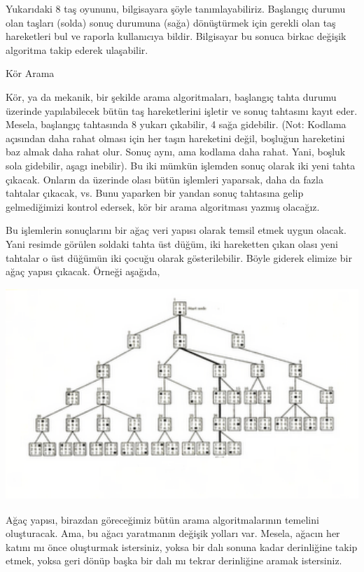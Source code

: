 \documentclass[12pt,fleqn]{article}\usepackage{../../common}
\begin{document}
Yukarıdaki 8 taş oyununu, bilgisayara şöyle tanımlayabiliriz. Başlangıç
durumu olan taşları (solda) sonuç durumuna (sağa) dönüştürmek için gerekli
olan taş hareketleri bul ve raporla kullanıcıya bildir. Bilgisayar bu
sonuca birkac değişik algoritma takip ederek ulaşabilir.

Kör Arama

Kör, ya da mekanik, bir şekilde arama algoritmaları, başlangıç tahta durumu
üzerinde yapılabilecek bütün taş hareketlerini işletir ve sonuç tahtasını
kayıt eder. Mesela, başlangıç tahtasında 8 yukarı çıkabilir, 4 sağa
gidebilir. (Not: Kodlama açısından daha rahat olması için her taşın
hareketini değil, boşluğun hareketini baz almak daha rahat olur. Sonuç
aynı, ama kodlama daha rahat. Yani, boşluk sola gidebilir, aşagı
inebilir). Bu iki mümkün işlemden sonuç olarak iki yeni tahta
çıkacak. Onların da üzerinde olası bütün işlemleri yaparsak, daha da fazla
tahtalar çıkacak, vs. Bunu yaparken bir yandan sonuç tahtasına gelip
gelmediğimizi kontrol edersek, kör bir arama algoritması yazmış olacağız.

Bu işlemlerin sonuçlarını bir ağaç veri yapısı olarak temsil etmek uygun
olacak. Yani resimde görülen soldaki tahta üst düğüm, iki hareketten çıkan
olası yeni tahtalar o üst düğümün iki çocuğu olarak gösterilebilir. Böyle
giderek elimize bir ağaç yapısı çıkacak. Örneği aşağıda,

\includegraphics[height=8cm]{8-puzzle-tree.png}

Ağaç yapısı, birazdan göreceğimiz bütün arama algoritmalarının temelini
oluşturacak. Ama, bu ağacı yaratmanın değişik yolları var. Mesela, ağacın
her katını mı önce oluşturmak istersiniz, yoksa bir dalı sonuna kadar
derinliğine takip etmek, yoksa geri dönüp başka bir dalı mı tekrar
derinliğine aramak istersiniz.
\end{document}
